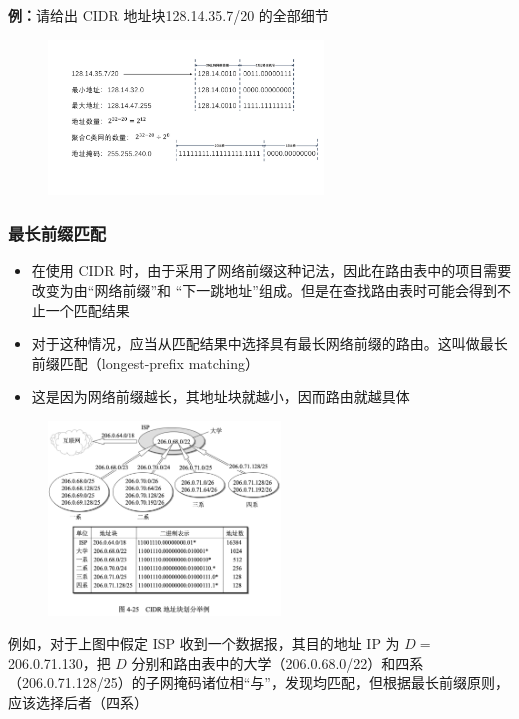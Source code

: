 \documentclass[cs4size,a4paper,10pt]{ctexart}
\begin{document}
	\textbf{例：}请给出 CIDR 地址块128.14.35.7/20 的全部细节
	\begin{figure}[H]
		\centering
		\includegraphics[width=0.65\textwidth]{img/4.3.3.1}
	\end{figure}

	\subsubsection{最长前缀匹配}
	\begin{itemize}
		\item 在使用 CIDR 时，由于采用了网络前缀这种记法，因此在路由表中的项目需要改变为由“网络前缀”和 “下一跳地址”组成。但是在查找路由表时可能会得到不止一个匹配结果
		\item 对于这种情况，应当从匹配结果中选择具有最长网络前缀的路由。这叫做最长前缀匹配（longest-prefix matching）
		\item 这是因为网络前缀越长，其地址块就越小，因而路由就越具体
	\end{itemize}

	\begin{figure}[H]
		\centering
		\includegraphics[width=0.55\textwidth]{img/4.25}
	\end{figure}

	例如，对于上图中假定 ISP 收到一个数据报，其目的地址 IP 为 $D=$206.0.71.130，把 $D$ 分别和路由表中的大学（206.0.68.0/22）和四系（206.0.71.128/25）的子网掩码诸位相“与”，发现均匹配，但根据最长前缀原则，应该选择后者（四系）
\end{document}
